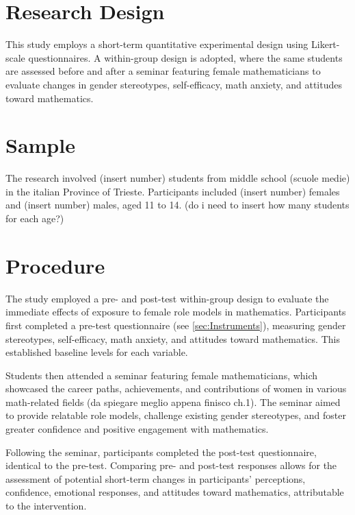 \section{Research Design}
This study employs a short-term quantitative experimental design using Likert-scale questionnaires. A within-group design is adopted, where the same students are assessed before and after a seminar featuring female mathematicians to evaluate changes in gender stereotypes, self-efficacy, math anxiety, and attitudes toward mathematics.

\section{Sample}
The research involved (insert number) students from middle school (scuole medie) in the italian Province of Trieste. Participants included (insert number) females and (insert number) males, aged 11 to 14. 
(do i need to insert how many students for each age?)

\section{Procedure}
The study employed a pre- and post-test within-group design to evaluate the immediate effects of exposure to female role models in mathematics. Participants first completed a pre-test questionnaire (see \ref{sec:Instruments}), measuring gender stereotypes, self-efficacy, math anxiety, and attitudes toward mathematics. This established baseline levels for each variable.

Students then attended a seminar featuring female mathematicians, which showcased the career paths, achievements, and contributions of women in various math-related fields (da spiegare meglio appena finisco ch.1). The seminar aimed to provide relatable role models, challenge existing gender stereotypes, and foster greater confidence and positive engagement with mathematics.

Following the seminar, participants completed the post-test questionnaire, identical to the pre-test. Comparing pre- and post-test responses allows for the assessment of potential short-term changes in participants’ perceptions, confidence, emotional responses, and attitudes toward mathematics, attributable to the intervention.

